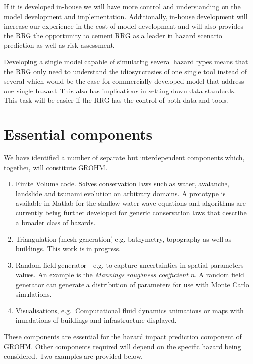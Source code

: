\documentclass{article}
\newcounter{lastnumber} %
\begin{document}
If it is developed in-house we will have more control and
understanding on the model development and implementation.
Additionally, in-house development will increase our experience in
the cost of model development and will also provides the RRG the
opportunity to cement RRG as a leader in hazard scenario
prediction as well as risk assessment.

Developing a single model capable of simulating several hazard types means that the RRG only need to understand the idiosyncrasies of one single tool
instead of several which would be the case for commercially developed model
that address one single hazard.
This also has implications in setting down data standards.
This task will be easier if the RRG has the control of both data and tools.


\section{Essential components}

We have identified a number of separate but interdependent components which, 
together, will constitute GROHM.

\begin{enumerate}
\item Finite Volume code.  Solves conservation laws such as water,
  avalanche, landslide and tsunami evolution on arbitrary domains. A
  prototype is available in Matlab for the shallow water wave
  equations and algorithms are currently being further developed for
  generic conservation laws that describe a broader class of hazards.
  \label{item:FV}
\item Triangulation (mesh generation) e.g. bathymetry, topography as
  well as buildings. This work is in progress.
  \label{item:TIN}
\item Random field generator - e.g. to capture uncertainties in
  spatial parameters values. An example is the \textit{Mannings
  roughness coefficient} $n$.  A random field generator can generate a
  distribution of parameters for use with Monte Carlo simulations.
  \label{item:RAND}
\item Visualisations, e.g.\ Computational fluid dynamics animations or
  maps with inundations of buildings and infrastructure displayed.
  \label{item:VIZ}

\setcounter{lastnumber}{\theenumi}
\end{enumerate}

These components are essential for the hazard impact prediction
component of GROHM.
Other components required will depend on the
specific hazard being considered. Two examples are provided
below.
\end{document}
